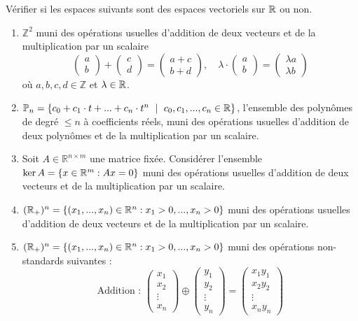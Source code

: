 \begin{exercice}
Vérifier si les espaces suivants sont des espaces vectoriels sur $\mathbb{R}$ ou non.

\begin{enumerate}
    \item $\mathbb Z^2$ muni des opérations usuelles d'addition de deux vecteurs et de la multiplication par un scalaire
        $$\begin{pmatrix} a \\ b \end{pmatrix} + \begin{pmatrix} c \\ d \end{pmatrix} = \begin{pmatrix} a + c \\ b + d \end{pmatrix}, \quad \lambda \cdot \begin{pmatrix} a \\ b \end{pmatrix} = \begin{pmatrix} \lambda a \\ \lambda b \end{pmatrix}$$
        où $a,b,c,d \in \mathbb Z$ et $\lambda \in \mathbb{R}$.
    \item $\mathbb{P}_n = \{c_0 + c_1 \cdot t + ... + c_{n} \cdot t^{n} \ \mid \ c_0, c_1, ..., c_{n} \in \mathbb{R}\}$, l'ensemble des polynômes de degré $\leq n$ à coefficients réels, muni des opérations usuelles d'addition de deux polynômes et de la multiplication par un scalaire.
    \item Soit $A \in \mathbb R^{n \times m}$ une matrice fixée. Considérer l'ensemble $\ker A = \{x \in \mathbb{R}^m : Ax = 0\}$ muni des opérations usuelles d'addition de deux vecteurs et de la multiplication par un scalaire.
    \item $(\mathbb{R}_+)^n = \{(x_1,...,x_n) \in \mathbb R^n : x_1 > 0, ..., x_n > 0\}$ muni des opérations usuelles d'addition de deux vecteurs et de la multiplication par un scalaire.
    \item $(\mathbb{R}_+)^n = \{(x_1,...,x_n) \in \mathbb R^n : x_1 > 0, ..., x_n > 0\}$ muni des opérations non-standards suivantes :
    $$\text{Addition : } \begin{pmatrix}
            x_1 \\ x_2 \\ \vdots \\ x_n
        \end{pmatrix} \oplus 
        \begin{pmatrix}
            y_1 \\ y_2 \\ \vdots \\ y_n
        \end{pmatrix} =
        \begin{pmatrix}
            x_1y_1 \\ x_2y_2 \\ \vdots \\ x_ny_n
        \end{pmatrix}$$
    

\end{enumerate}
\end{exercice}
